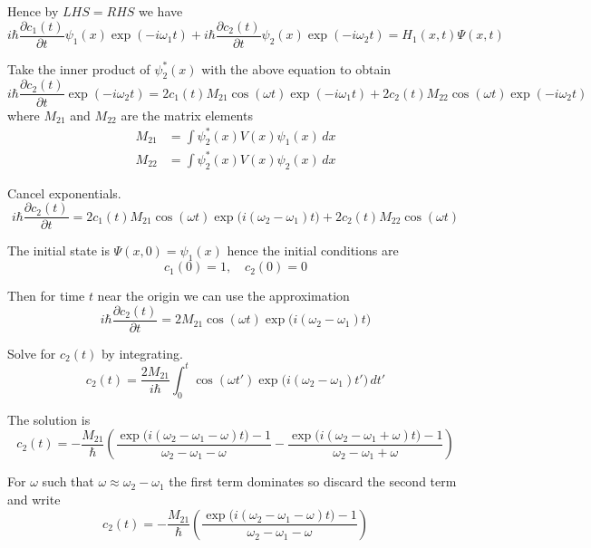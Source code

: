 \documentclass[12pt]{article}
\begin{document}
Hence by $LHS=RHS$ we have
\begin{equation*}
i\hbar\frac{\partial c_1(t)}{\partial t}\psi_1(x)\exp(-i\omega_1t)
+i\hbar\frac{\partial c_2(t)}{\partial t}\psi_2(x)\exp(-i\omega_2t)
=H_1(x,t)\Psi(x,t)
\end{equation*}

Take the inner product of $\psi_2^*(x)$ with the above equation to obtain
\begin{equation*}
i\hbar\frac{\partial c_2(t)}{\partial t}\exp(-i\omega_2t)
=2c_1(t)M_{21}\cos(\omega t)\exp(-i\omega_1t)+2c_2(t)M_{22}\cos(\omega t)\exp(-i\omega_2t)
\end{equation*}
%
where $M_{21}$ and $M_{22}$ are the matrix elements
\begin{align*}
M_{21}&=\int\psi_2^*(x)V(x)\psi_1(x)\,dx
\\
M_{22}&=\int\psi_2^*(x)V(x)\psi_2(x)\,dx
\end{align*}

Cancel exponentials.
\begin{equation*}
i\hbar\frac{\partial c_2(t)}{\partial t}
=2c_1(t)M_{21}\cos(\omega t)\exp\bigl(i(\omega_2-\omega_1)t\bigr)+2c_2(t)M_{22}\cos(\omega t)
\end{equation*}

The initial state is $\Psi(x,0)=\psi_1(x)$ hence the initial conditions are
\begin{equation*}
c_1(0)=1,\quad c_2(0)=0
\end{equation*}

Then for time $t$ near the origin we can use the approximation
\begin{equation*}
i\hbar\frac{\partial c_2(t)}{\partial t}
=2M_{21}\cos(\omega t)\exp\bigl(i(\omega_2-\omega_1)t\bigr)
\end{equation*}

Solve for $c_2(t)$ by integrating.
\begin{equation*}
c_2(t)=\frac{2M_{21}}{i\hbar}
\int_0^t\cos(\omega t')\exp\bigl(i(\omega_2-\omega_1)t'\bigr)\,dt'
\end{equation*}

The solution is
\begin{equation*}
c_2(t)
=-\frac{M_{21}}{\hbar}
\left(
\frac{\exp\bigl(i(\omega_2-\omega_1-\omega) t\bigr)-1}{\omega_2-\omega_1-\omega}
-
\frac{\exp\bigl(i(\omega_2-\omega_1+\omega) t\bigr)-1}{\omega_2-\omega_1+\omega}
\right)
\tag{1}
\end{equation*}

For $\omega$ such that $\omega\approx\omega_2-\omega_1$ the first term
dominates so discard the second term and write
\begin{equation*}
c_2(t)=-\frac{M_{21}}{\hbar}
\left(
\frac{\exp\bigl(i(\omega_2-\omega_1-\omega) t\bigr)-1}{\omega_2-\omega_1-\omega}
\right)
\end{equation*}
\end{document}
